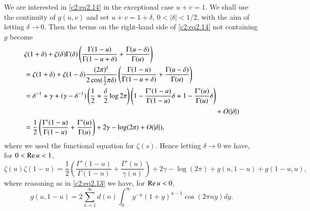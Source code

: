 We are interested in \eqref{c2:eq2.14} in the exceptional case
$u+v=1$. We shall use the continuity of $g(u, v)$ and set
$u+v=1+\delta$, $0 < |\delta| < 1/2$, with the aim of letting $\delta
\to 0$. Then the terms on the right-hand side of \eqref{c2:eq2.14} not
containing $g$ become
\begin{align*}
  & \zeta (1+ \delta) + \zeta (\delta) \Gamma (\delta) \left(
  \frac{\Gamma (1-u)}{\Gamma (1- u + \delta)} + \frac{\Gamma (u -
    \delta)}{\Gamma (u)}\right)\\
  & = \zeta (1+ \delta) + \zeta (1- \delta) \frac{(2 \pi)^\delta}{2
    \cos (\frac{1}{2} \pi \delta)} \left( \frac{\Gamma (1- u)}{\Gamma
    (1- u + \delta)} + \frac{\Gamma (u- \delta)}{\Gamma(u)}\right)\\
  & = \delta^{-1} + \gamma + (\gamma - \delta^{-1}) \left(\frac{1}{2}
  + \frac{\delta}{2} \log 2 \pi  \right) \left(1-
  \frac{\Gamma'(1-u)}{\Gamma (1- u)} \delta +1 - \frac{\Gamma'
    (u)}{\Gamma (u)} \delta \right)\\ 
  & \hspace{9.5cm}+ O (|\delta|)\\
  & = \frac{1}{2} \left( \frac{\Gamma' (1-u)}{\Gamma (1- u)}+
  \frac{\Gamma' (u)}{\Gamma (u)}\right) + 2 \gamma - \log (2 \pi) + O
  (|\delta|), 
\end{align*}
where we used the functional equation for $\zeta (s)$. Hence letting
$\delta \to 0$ we have, for $0< \operatorname{Re} u < 1$,
\begin{equation}
  \zeta (u) \zeta (1-u) = \frac{1}{2} \left( \frac{\Gamma' (1-
    u)}{\Gamma (1-u)} + \frac{\Gamma' (u)}{\gamma (u)}\right) + 2
  \gamma - \log (2 \pi) + g(u, 1- u)+ g (1- u, u), \label{c2:eq2.15}
\end{equation}
where reasoning as in \eqref{c2:eq2.13} we have, for $\operatorname{Re} u < 0$,
\begin{equation}
  g(u, 1- u) = 2 \sum^\infty_{n=1} d(n) \int^\infty_{0} y^{-u} (1+
  y)^{u-1} \cos (2 \pi n y) dy.\label{c2:eq2.16}
\end{equation}

